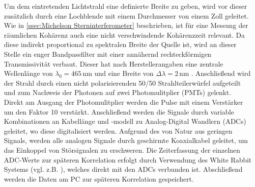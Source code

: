 Um dem eintretenden Lichtstrahl eine definierte Breite zu geben, wird vor dieser zusätzlich durch eine Lochblende mit einem Durchmesser von einem Zoll geleitet. 
Wie in \autoref{ssec:Michelson Sterninterferometer} beschrieben, ist für eine Messung der räumlichen Kohärenz auch eine nicht verschwindende Kohärenzzeit relevant. 
Da diese indirekt proportional zu spektralen Breite der Quelle ist, wird an dieser Stelle ein enger Bandpassfilter mit einer annähernd rechteckförmigen Transmissivität verbaut. 
Dieser hat nach Herstellerangaben eine zentrale Wellenlänge von $\lambda_0 = 465\,\mathrm{nm}$ und eine Breite von  $\Delta\lambda = 2\,\mathrm{nm}$ \cite{4652OD4Ultra}. 
Anschließend wird der Strahl durch einen nicht polarisierenden 50/50 Strahlteilerwürfel aufgeteilt und zum Nachweis der Photonen auf zwei Photomulitplier (PMTs) gelenkt. 
Direkt am Ausgang der Photomulitplier werden die Pulse mit einem Verstärker um den Faktor 10 verstärkt. 
Anschließend werden die Signale durch variable Kombinationen an Kabellänge und -modell zu Analog-Digital Wandlern (ADCs) geleitet, wo diese digitalisiert werden. 
Aufgrund des von Natur aus geringen Signals, werden alle analogen Signale durch geschirmte Koaxialkabel geleitet, um das Einkoppel von Störsignalen zu erschweren. 
Die Zeiterfassung der einzelnen ADC-Werte zur späteren Korrelation erfolgt durch Verwendung des White Rabbit Systems (vgl. z.B. \cite{lipinskiWhiteRabbitPTP2011}), welches direkt mit den ADCs verbunden ist. 
Abschließend werden die Daten am PC zur späteren Korrelation gespeichert. \\

